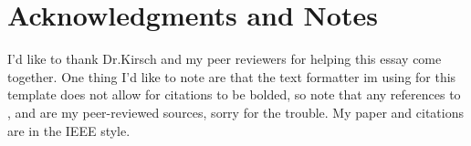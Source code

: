 \documentclass[journal]{IEEEtran}
\begin{document}

\section*{Acknowledgments and Notes}
I'd like to thank Dr.Kirsch and my peer reviewers for helping this essay come together. 
One thing I'd like to note are that the text formatter im using for this template does
not allow for citations to be bolded, so note that any references to \cite{stokes2021},
\cite{harvard} and \cite{ma2024} are my peer-reviewed sources, sorry for the trouble.
My paper and citations are in the IEEE style.



\printbibliography
\end{document}
